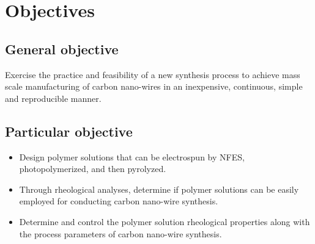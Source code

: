 
\chapter{Objectives} %

\label{Chapter:Objectives}

\section{General objective}
Exercise the practice and feasibility of a new synthesis process to achieve mass scale manufacturing of carbon nano-wires in an inexpensive, continuous, simple and reproducible manner.

\section{Particular objective}

\begin{itemize}
	\item{
	Design polymer solutions that can be electrospun by NFES, photopolymerized, and then pyrolyzed.
    }
    \item{
    Through rheological analyses, determine if polymer solutions can be easily employed for conducting carbon nano-wire synthesis.
    }
    \item{
    Determine and control the polymer solution rheological properties along with the process parameters of carbon nano-wire synthesis.
    }
\end{itemize}




